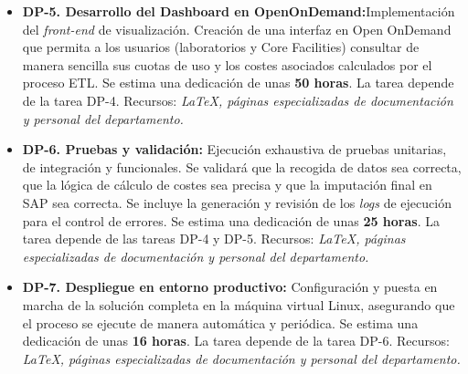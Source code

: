 \begin{itemize}
    \item \textbf{DP-5. Desarrollo del Dashboard en OpenOnDemand:}Implementación del \textit{front-end} de visualización. Creación de una interfaz en Open OnDemand 
    que permita a los usuarios (laboratorios y Core Facilities) consultar de manera sencilla sus cuotas de uso y los costes asociados calculados por el proceso ETL. Se estima 
    una dedicación de unas \textbf{50 horas}.
    \newline La tarea depende de la tarea DP-4.
    \newline Recursos: \textit {LaTeX, páginas especializadas de documentación y personal del departamento.}
    
    \item \textbf{DP-6. Pruebas y validación:} Ejecución exhaustiva de pruebas unitarias, de integración y funcionales. Se validará que la recogida de datos sea correcta,
    que la lógica de cálculo de costes sea precisa y que la imputación final en SAP sea correcta. Se incluye la generación y revisión de los \textit{logs} 
    de ejecución para el control de errores. Se estima una dedicación de unas \textbf{25 horas}.
    \newline La tarea depende de las tareas DP-4 y DP-5.
    \newline Recursos: \textit {LaTeX, páginas especializadas de documentación y personal del departamento.}
    
    \item \textbf{DP-7. Despliegue en entorno productivo:} Configuración y puesta en marcha de la solución completa en la máquina virtual Linux, asegurando que el proceso
    se ejecute de manera automática y periódica. Se estima una dedicación de unas \textbf{16 horas}.
    \newline La tarea depende de la tarea DP-6.
    \newline Recursos: \textit {LaTeX, páginas especializadas de documentación y personal del departamento.}
\end{itemize}